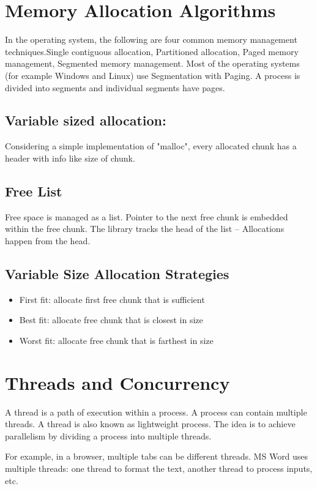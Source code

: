 \documentclass{article}
\begin{document}
\section{Memory Allocation Algorithms}
In the operating system, the following are four common memory management techniques.Single contiguous allocation, Partitioned allocation, Paged memory management, Segmented memory management. 
Most of the operating systems (for example Windows and Linux) use Segmentation with Paging. A process is divided into segments and individual segments have pages.

\subsection{Variable sized allocation:}
Considering a simple implementation of "malloc", every allocated chunk has a header with info like size of chunk.
\subsection{Free List}
Free space is managed as a list. Pointer to the next free chunk is embedded within the free chunk. The library tracks the head of the list – Allocations happen from the head.
\subsection{Variable Size Allocation Strategies}
\begin{itemize}
    \item First fit: allocate first free chunk that is sufficient
    \item Best fit: allocate free chunk that is closest in size
    \item Worst fit: allocate free chunk that is farthest in size
\end{itemize}
\section{Threads and Concurrency}
A thread is a path of execution within a process. A process can contain multiple threads. A thread is also known as lightweight process. The idea is to achieve parallelism by dividing a process into multiple threads. 

For example, in a browser, multiple tabs can be different threads. MS Word uses multiple threads: one thread to format the text, another thread to process inputs, etc.
\end{document}
